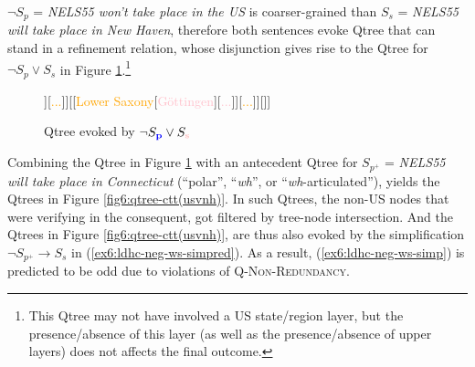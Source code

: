 $\neg S_{p}$ = \textit{NELS55 won't take place in the US} is coarser-grained than $S_{s}$ = \textit{NELS55 will take place in New Haven}, therefore both sentences evoke Qtree that can stand in a refinement relation, whose disjunction gives rise to the Qtree for $\neg S_{p} \vee S_s$ in Figure \ref{fig6:qtree-usvnh}.\footnote{This Qtree may not have involved a US state/region layer, but the presence/absence of this layer (as well as the presence/absence of upper layers) does not affects the final outcome.}

\begin{figure}[H]
	\centering
	\begin{forest}
		[CS[\textcolor{blue}{US}[{\textcolor{orange}{Connecticut}}[\fbox{\textcolor{pink}{New Haven}}][\textcolor{pink}{...}]][\textcolor{orange}{...}]][\fbox{\textcolor{blue}{Germany}}[\textcolor{orange}{Lower Saxony}[{\textcolor{pink}{Göttingen}}][\textcolor{pink}{...}]][\textcolor{orange}{...}]][\fbox{\textcolor{blue}{...}}]]
	\end{forest}
	\caption[]{Qtree evoked by $\neg S_{\p} \vee S_{\s}$}\label{fig6:qtree-usvnh}
\end{figure}

Combining the Qtree in Figure \ref{fig6:qtree-usvnh} with an antecedent Qtree for $S_{p^+}$ = \textit{NELS55 will take place in Connecticut} (``polar'', ``\textit{wh}'', or ``\textit{wh}-articulated''), yields the Qtrees in Figure \ref{fig6:qtree-ctt(usvnh)}. In such Qtrees, the non-US nodes that were verifying in the consequent, got filtered by tree-node intersection. And the Qtrees in Figure \ref{fig6:qtree-ctt(usvnh)}, are thus also evoked by the simplification $\neg S_{p^+} \rightarrow S_s$ in (\ref{ex6:ldhc-neg-ws-simpred}). As a result, (\ref{ex6:ldhc-neg-ws-simp}) is predicted to be odd due to violations of \textsc{Q-Non-Redundancy}.


